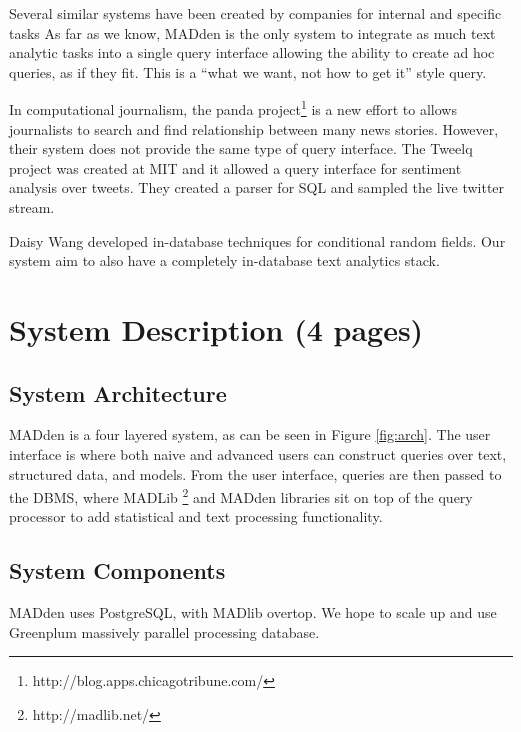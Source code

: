 \documentclass[11pt]{article}
\newcommand{\system}{MADden\xspace}
\begin{document}
Several similar systems have been created by companies for 
internal and specific tasks
As far as we know, \system is the only system to integrate as much text analytic
tasks into a single query interface allowing the ability to 
create ad hoc queries, as if they fit.
  This is a ``what we want, not how to get it'' style query.

In computational journalism, the panda project\footnote{http://blog.apps.chicagotribune.com/}  
is a new effort to allows journalists to search and find relationship between 
many news stories. However, their system does not provide the same type of 
query interface.
The Tweelq project was created at MIT and it allowed a query interface for 
sentiment analysis over tweets. They created a parser for SQL and 
sampled the live twitter stream.

Daisy Wang \cite{wang2011hybrid} developed in-database techniques for 
conditional random fields. Our system aim to also have a completely in-database
text analytics stack.


  \section{System Description (4 pages)}
  \subsection{System Architecture}

  {\system} is a four layered system, as can be seen in Figure \ref{fig:arch}.
  The user interface is where both naive and advanced users can construct queries over text, structured data, and models.
  From the user interface,
  queries are then passed to the DBMS,
  where MADLib \footnote{http://madlib.net/} and {\system} libraries sit on top of the query processor to add statistical and text processing functionality.


  \subsection{System Components}

  \system uses PostgreSQL, with MADlib overtop.
  We hope to scale up and use Greenplum massively parallel processing database.
\end{document}
